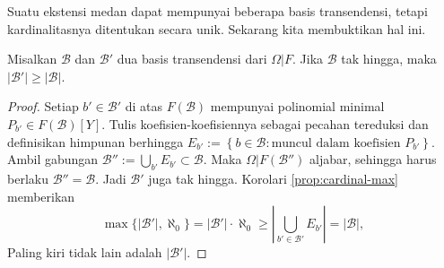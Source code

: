 Suatu ekstensi medan dapat mempunyai beberapa basis transendensi, tetapi kardinalitasnya ditentukan secara unik. Sekarang kita membuktikan hal ini.
\begin{lemma}\label{prop:generator-cardinal-field}
	Misalkan $\mathcal{B}$ dan $\mathcal{B}'$ dua basis transendensi dari $\Omega|F$. Jika $\mathcal{B}$ tak hingga, maka $|\mathcal{B}'| \geq |\mathcal{B}|$.
\end{lemma}
\begin{proof}
	Setiap $b' \in \mathcal{B}'$ di atas $F(\mathcal{B})$ mempunyai polinomial minimal $P_{b'} \in F(\mathcal{B})[Y]$. Tulis koefisien-koefisiennya sebagai pecahan tereduksi dan definisikan himpunan berhingga $E_{b'} := \left\{ b \in \mathcal{B}: \text{muncul dalam koefisien $P_{b'}$} \right\}$. Ambil gabungan $\mathcal{B}'' := \bigcup_{b'} E_{b'} \subset \mathcal{B}$. Maka $\Omega|F(\mathcal{B}'')$ aljabar, sehingga harus berlaku $\mathcal{B}''=\mathcal{B}$. Jadi $\mathcal{B}'$ juga tak hingga. Korolari \ref{prop:cardinal-max} memberikan
	\[ \max\{|\mathcal{B}'|, \aleph_0 \} = |\mathcal{B}'| \cdot \aleph_0 \geq \left| \bigcup_{b' \in \mathcal{B}'} E_{b'} \right| = |\mathcal{B}|, \]
	Paling kiri tidak lain adalah $|\mathcal{B}'|$.
\end{proof}

